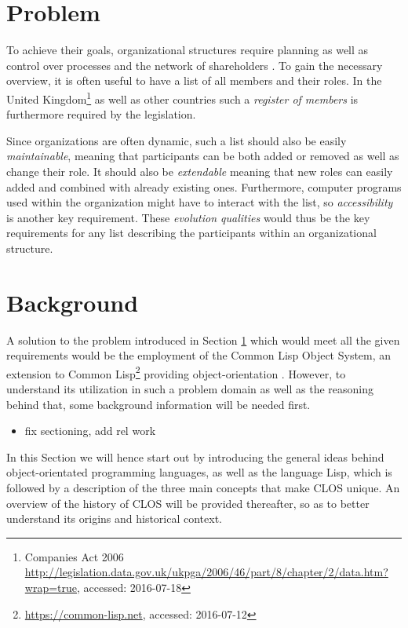 \documentclass[oribibl]{llncs}
\begin{document}
\section{Problem}
\label{sec:problem}

To achieve their goals, organizational structures require planning as well as control over processes and the network of shareholders \cite[42f.]{Schmidt2000}. To gain the necessary overview, it is often useful to have a list of all members and their roles. In the United Kingdom\footnote{Companies Act 2006 \url{http://legislation.data.gov.uk/ukpga/2006/46/part/8/chapter/2/data.htm?wrap=true}, accessed: 2016-07-18} as well as other countries such a \emph{register of members} is furthermore required by the legislation.

Since organizations are often dynamic, such a list should also be easily \emph{maintainable}, meaning that participants can be both added or removed as well as change their role. It should also be \emph{extendable} meaning that new roles can easily added and combined with already existing ones. Furthermore, computer programs used within the organization might have to interact with the list, so \emph{accessibility} is another key requirement. These \emph{evolution qualities} \cite{young2001effective} would thus be the key requirements for  any list describing the participants within an organizational structure.


\section{Background}
\label{sec:background}
A solution to the problem introduced in Section \ref{sec:problem} which would meet all the given requirements would be the employment of the Common Lisp Object System, an extension to Common Lisp\footnote{\url{https://common-lisp.net}, accessed: 2016-07-12} providing object-orientation \cite{demichiel1987common}. However, to understand its utilization in such a problem domain as well as the reasoning behind that, some background information will be needed first.

\begin{itemize}
\item fix sectioning, add rel work
\end{itemize}

In this Section we will hence start out by introducing the general ideas behind object-orientated programming languages, as well as the language Lisp, which is followed by a description of the three main concepts that make CLOS unique. An overview of the history of CLOS will be provided thereafter, so as to better understand its origins and historical context.
\end{document}
